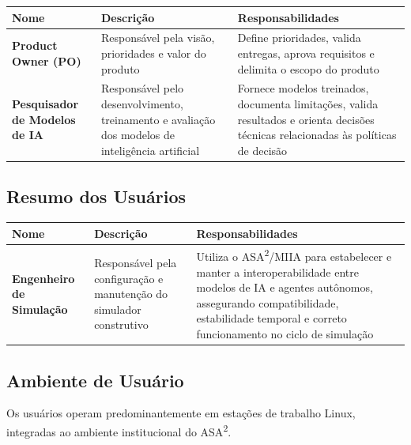 \begin{table}[h]
    \begin{tabular}{| p{} | p{} | p{} |}
        \hline Nome & Descrição & Responsabilidades \\ \hline
        
        \textbf{Product Owner (PO)} &
        Responsável pela visão, prioridades e valor do produto &
        Define prioridades, valida entregas, aprova requisitos e delimita o escopo do produto \\ \hline
        
        \textbf{Pesquisador de Modelos de IA} &
        Responsável pelo desenvolvimento, treinamento e avaliação dos modelos de inteligência artificial &
        Fornece modelos treinados, documenta limitações, valida resultados e orienta decisões técnicas relacionadas às políticas de decisão \\ \hline

    \end{tabular}
\end{table}

\subsection{Resumo dos Usuários}

\begin{table}[h]
    \begin{tabular}{| p{} | p{} | p{} |}
        \hline Nome & Descrição & Responsabilidades \\ \hline
              
        \textbf{Engenheiro de Simulação} &
        Responsável pela configuração e manutenção do simulador construtivo &
        Utiliza o ASA\textsuperscript{2}/MIIA para estabelecer e manter a interoperabilidade entre modelos de IA e agentes autônomos, assegurando compatibilidade, estabilidade temporal e correto funcionamento no ciclo de simulação \\ \hline

    \end{tabular}
\end{table}

\subsection{Ambiente de Usuário}

Os usuários operam predominantemente em estações de trabalho Linux, integradas ao ambiente institucional do ASA\textsuperscript{2}.


